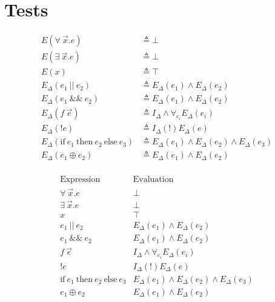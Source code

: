 
%

\chapter{Tests}
\label{cha:tests}

\begin{align*}
  E(\forall\ \vec{x}.e) &\triangleq \bot  \\
  E(\exists\ \vec{x}.e) &\triangleq \bot  \\
  E(x) &\triangleq \top  \\
  E_{\Delta} (e_1\ \vert\vert\ e_2) &\triangleq E_{\Delta}(e_1) \land E_{\Delta}(e_2) \\
  E_{\Delta} (e_1\ \&\&\ e_2) &\triangleq E_{\Delta}(e_1) \land E_{\Delta}(e_2) \\
  E_{\Delta} (f\ \vec{e}) &\triangleq I_{\Delta} \land \forall_{e_i} E_{\Delta}(e_i) \\
  E_{\Delta}(!e) &\triangleq I_{\Delta}(!) E_{\Delta}(e) \\
  E_{\Delta}(\text{if}\ e_1\ \text{then}\ e_2\ \text{else}\ e_3) &\triangleq E_{\Delta}(e_1) \land E_{\Delta}(e_2) \land E_{\Delta}(e_3)  \\
  E_{\Delta}(e_1 \oplus e_2) &\triangleq E_{\Delta}(e_1) \land E_{\Delta}(e_2) \\
\end{align*}

$$
  \begin{array}{cc}
    \text{Expression} & \text{Evaluation} \\
    \hline
    \forall\ \vec{x}.e & \bot  \\
    \exists\ \vec{x}.e & \bot  \\
    x & \top \\
    e_1\ \vert\vert\ e_2 & E_{\Delta}(e_1) \land E_{\Delta}(e_2) \\
    e_1\ \&\&\ e_2 & E_{\Delta}(e_1) \land E_{\Delta}(e_2) \\
    f\ \vec{e} & I_{\Delta} \land \forall_{e_i} E_{\Delta}(e_i) \\
    !e & I_{\Delta}(!) E_{\Delta}(e) \\
    \text{if}\ e_1\ \text{then}\ e_2\ \text{else}\ e_3 & E_{\Delta}(e_1) \land E_{\Delta}(e_2) \land E_{\Delta}(e_3) \\
    e_1 \oplus e_2 & E_{\Delta}(e_1) \land E_{\Delta}(e_2) \\
  \end{array}
$$